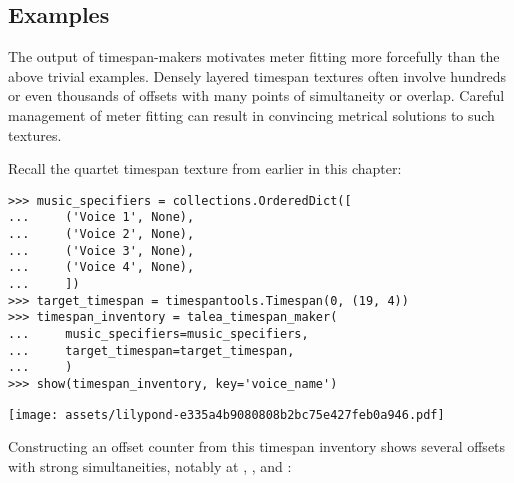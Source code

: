 \subsection{Examples}
\label{ssec:meter-fitting-examples}

The output of timespan-makers motivates meter fitting more forcefully than the
above trivial examples. Densely layered timespan textures often involve
hundreds or even thousands of offsets with many points of simultaneity or
overlap. Careful management of meter fitting can result in convincing metrical
solutions to such textures.

Recall the quartet timespan texture from earlier in this chapter:

\begin{comment}
<abjad>
music_specifiers = collections.OrderedDict([
    ('Voice 1', None),
    ('Voice 2', None),
    ('Voice 3', None),
    ('Voice 4', None),
    ])
target_timespan = timespantools.Timespan(0, (19, 4))
timespan_inventory = talea_timespan_maker(
    music_specifiers=music_specifiers,
    target_timespan=target_timespan,
    )
show(timespan_inventory, key='voice_name')
</abjad>
\end{comment}

\begin{abjadbookoutput}
\begin{singlespacing}
\vspace{-0.5\baselineskip}
\begin{verbatim}
>>> music_specifiers = collections.OrderedDict([
...     ('Voice 1', None),
...     ('Voice 2', None),
...     ('Voice 3', None),
...     ('Voice 4', None),
...     ])
>>> target_timespan = timespantools.Timespan(0, (19, 4))
>>> timespan_inventory = talea_timespan_maker(
...     music_specifiers=music_specifiers,
...     target_timespan=target_timespan,
...     )
>>> show(timespan_inventory, key='voice_name')
\end{verbatim}
\noindent\texttt{[image: assets/lilypond-e335a4b9080808b2bc75e427feb0a946.pdf]}
\end{singlespacing}
\end{abjadbookoutput}

\noindent Constructing an offset counter from this timespan inventory shows
several offsets with strong simultaneities, notably at ,
,  and :

\begin{comment}
<abjad>
offset_counter = metertools.OffsetCounter(timespan_inventory)
show(offset_counter, range_=(0, (19, 4)))
</abjad>
\end{comment}

